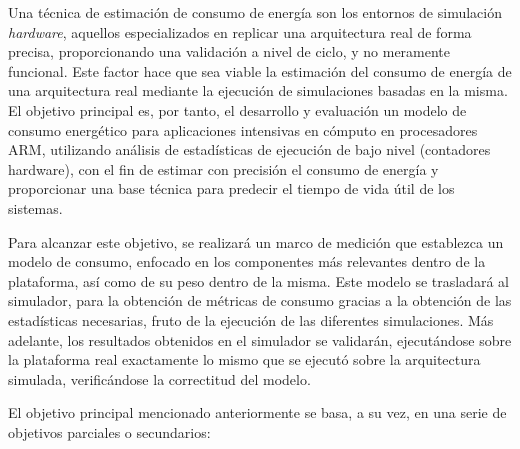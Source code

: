 Una técnica de estimación de consumo de energía son los entornos de simulación \textit{hardware}, aquellos especializados en replicar una arquitectura real de forma precisa, proporcionando una validación a nivel de ciclo, y no meramente funcional. Este factor hace que sea viable la estimación del consumo de energía de una arquitectura real mediante la ejecución de simulaciones basadas en la misma. El objetivo principal es, por tanto, el desarrollo y evaluación un modelo de consumo energético para aplicaciones intensivas en cómputo en procesadores \ac{ARM}, utilizando análisis de estadísticas de ejecución de bajo nivel (contadores hardware), con el fin de estimar con precisión el consumo de energía y proporcionar una base técnica para predecir el tiempo de vida útil de los sistemas. 

Para alcanzar este objetivo, se realizará un marco de medición que establezca un modelo de consumo, enfocado en los componentes más relevantes dentro de la plataforma, así como de su peso dentro de la misma. Este modelo se trasladará al simulador, para la obtención de métricas de consumo gracias a la obtención de las estadísticas necesarias, fruto de la ejecución de las diferentes simulaciones. Más adelante, los resultados obtenidos en el simulador se validarán, ejecutándose sobre la plataforma real exactamente lo mismo que se ejecutó sobre la arquitectura simulada, verificándose la correctitud del modelo.

El objetivo principal mencionado anteriormente se basa, a su vez, en una serie de objetivos parciales o secundarios:

